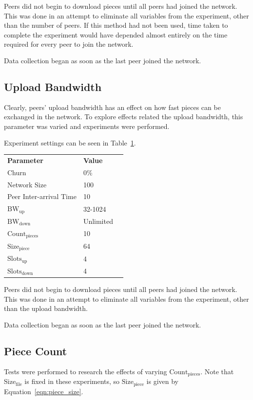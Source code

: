 \documentclass[a4paper,12pt,twocolumn]{article}
\newcommand{\tref}[1]{Table~\ref{#1}}
\newcommand{\eref}[1]{Equation~\ref{#1}}
\begin{document}
Peers did not begin to download pieces until all peers had joined the network. 
This was done in an attempt to eliminate all variables from the experiment, other than the number of peers.
If this method had not been used, time taken to complete the experiment would have depended almost entirely on the time required for every peer to join the network.

Data collection began as soon as the last peer joined the network.

\subsection{Upload Bandwidth}
\label{subsec:upload_bandwidth}
Clearly, peers' upload bandwidth has an effect on how fast pieces can be exchanged in the network. 
To explore effects related the upload bandwidth, this parameter was varied and experiments were performed.

Experiment settings can be seen in \tref{tab:upload_bandwidth}.

\begin{table}[!htbp]
\centering
\footnotesize
\begin{tabular}{lll}
\textbf{Parameter} & \textbf{Value} \\
Churn & 0\% \\
Network Size & 100 \\
Peer Inter-arrival Time & 10 \\
$\text{BW}_{\text{up}}$ & 32-1024 \\
$\text{BW}_{\text{down}}$ & Unlimited \\
$\text{Count}_{\text{pieces}}$ & 10 \\
$\text{Size}_{\text{piece}}$ & 64 \\
$\text{Slots}_{\text{up}}$ & 4 \\
$\text{Slots}_{\text{down}}$ & 4 \\
\end{tabular}
\label{tab:upload_bandwidth}
\end{table}

Peers did not begin to download pieces until all peers had joined the network. 
This was done in an attempt to eliminate all variables from the experiment, other than the upload bandwidth.

Data collection began as soon as the last peer joined the network.

\subsection{Piece Count}
\label{subsec:piece_count}
Tests were performed to research the effects of varying $\text{Count}_{\text{pieces}}$. Note that $\text{Size}_{\text{file}}$ is fixed in these experiments, so $\text{Size}_{\text{piece}}$ is given by \eref{eqn:piece_size}.
\end{document}
